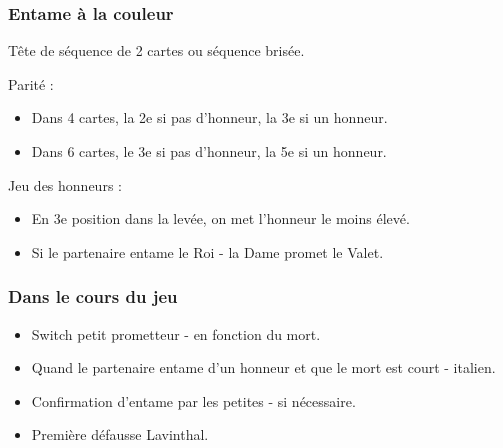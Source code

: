 \documentclass[a4paper]{article}
\begin{document}
\subsubsection{Entame à la couleur}

Tête de séquence de 2 cartes ou séquence brisée.

Parité :

\begin{itemize}
\item Dans 4 cartes, la 2e si pas d'honneur, la 3e si un honneur.

\item Dans 6 cartes, le 3e si pas d'honneur, la 5e si un honneur.

\end{itemize}

Jeu des honneurs :

\begin{itemize}
\item En 3e position dans la levée, on met l'honneur le moins élevé.

\item Si le partenaire entame le Roi - la Dame promet le Valet.

\end{itemize}

\subsubsection{Dans le cours du jeu}

\begin{itemize}
\item Switch petit prometteur - en fonction du mort.

\end{itemize}

\begin{itemize}
\item Quand le partenaire entame d'un honneur et que le mort est court - italien.

\end{itemize}

\begin{itemize}
\item Confirmation d'entame par les petites - si nécessaire.

\end{itemize}

\begin{itemize}
\item Première défausse Lavinthal.

\end{itemize}
\end{document}
